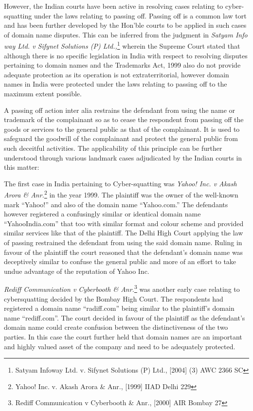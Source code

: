 \begin{multicols}{2}
\noi
However, the Indian courts have been active in resolving cases relating to cyber-squatting
under the laws relating to passing off. Passing off is a common law tort and has been further
developed by the Hon’ble courts to be applied in such cases of domain name disputes. This
can be inferred from the judgment in \textit{Satyam Info way Ltd. v Sifynet Solutions (P) Ltd.,}\footnote{Satyam Infoway Ltd. v. Sifynet Solutions (P) Ltd., [2004] (3) AWC 2366 SC}
wherein the Supreme Court stated that although there is no specific legislation in India with
respect to resolving disputes pertaining to domain names and the Trademarks Act, 1999 also
do not provide adequate protection as its operation is not extraterritorial, however domain
names in India were protected under the laws relating to passing off to the maximum extent
possible.

\noi
A passing off action inter alia restrains the defendant from using the name or trademark of the
complainant so as to cease the respondent from passing off the goods or services to the
general public as that of the complainant. It is used to safeguard the goodwill of the
complainant and protect the general public from such deceitful activities. The applicability of
this principle can be further understood through various landmark cases adjudicated by the
Indian courts in this matter:

\noi
The first case in India pertaining to Cyber-squatting was \textit{Yahoo! Inc. v Akash Arora \& Anr.}\footnote{Yahoo! Inc. v. Akash Arora \& Anr., [1999] IIAD Delhi 229}
in the year 1999. The plaintiff was the owner of the well-known mark “Yahoo!” and also of
the domain name “Yahoo.com.” The defendants however registered a confusingly similar or
identical domain name “YahooIndia.com” that too with similar format and colour scheme
and provided similar services like that of the plaintiff. The Delhi High Court applying the law
of passing restrained the defendant from using the said domain name. Ruling in favour of the
plaintiff the court reasoned that the defendant’s domain name was deceptively similar to
confuse the general public and more of an effort to take undue advantage of the reputation of
Yahoo Inc. 

\noi
\textit{Rediff Communication v Cyberbooth \& Anr.}\footnote{Rediff Communication v Cyberbooth \& Anr., [2000] AIR Bombay 27} was another early case relating to cybersquatting decided by the Bombay High Court. The respondents had registered a domain name
“radiff.com” being similar to the plaintiff’s domain name “rediff.com”. The court decided in
favour of the plaintiff as the defendant’s domain name could create confusion between the
distinctiveness of the two parties. In this case the court further held that domain names are an
important and highly valued asset of the company and need to be adequately protected.


\end{multicols}
